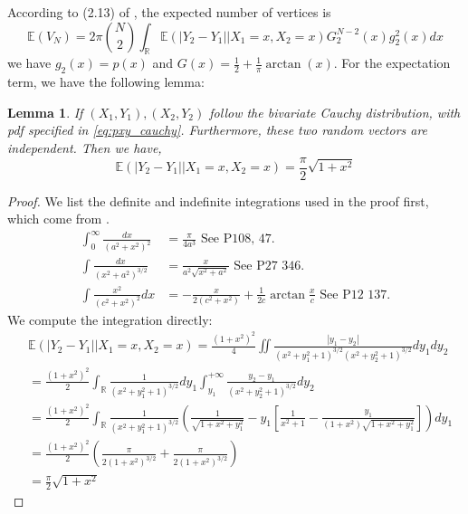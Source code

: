 \documentclass{article}
\newtheorem{lemma}{Lemma}
\def\E{\mathbb{E}}
\def\R{\mathbb{R}}
\begin{document}
According to (2.13) of \cite{efron1965convex},
the expected number of vertices is
\begin{equation}\label{eq:general_2d}
    \E(V_N) = 2\pi \binom{N}{2}
    \int_{\R}\E(|Y_2-Y_1| \Big\vert X_1= x, X_2=x)
    G^{N-2}_2(x) g^2_2(x)dx
\end{equation}
we have $g_2(x) = p(x)$ and $G(x)=\frac{1}{2}+ \frac{1}{\pi}\arctan(x)$.
For the expectation term, we have the following lemma:
\begin{lemma}
    If $(X_1, Y_1), (X_2, Y_2)$ follow the bivariate Cauchy
    distribution, with pdf specified in \eqref{eq:pxy_cauchy}.
    Furthermore, these two random vectors are independent.
    Then we have,
    \begin{equation}\label{eq:cauchy_conditional_expectation}
        \E(|Y_2-Y_1| \Big\vert X_1= x, X_2=x)
        = \frac{\pi}{2}\sqrt{1+x^2}
    \end{equation}
\end{lemma}
\begin{proof}
We list the definite and indefinite integrations
used in the proof first, which come from \cite{integration}.
\begin{align}
    \int_0^{\infty} \frac{dx}{(a^2+x^2)^2}
    & = \frac{\pi}{4a^3} \textrm{ See P108, 47. } \\
    \int \frac{dx}{(x^2+a^2)^{3/2}}
    & = \frac{x}{a^2\sqrt{x^2+a^2}}
    \textrm{ See P27 346.}
    \label{eq:indefinite_inverse_32}\\
    \int \frac{x^2}{(c^2+x^2)^2}dx
    &=-\frac{x}{2(c^2+x^2)}
    +\frac{1}{2c}\arctan\frac{x}{c}
    \textrm{ See P12 137.}
\end{align}
We compute the integration directly:
\begin{align*}
    &\E\left(|Y_2-Y_1| \Big\vert X_1= x, X_2=x\right)
        =\frac{(1+x^2)^2}{4}\iint \frac{|y_1-y_2|}
        {(x^2+y_1^2+1)^{3/2}(x^2+y_2^2+1)^{3/2}}dy_1dy_2\\
        &=\frac{(1+x^2)^2}{2}\int_{\R}\frac{1}{(x^2+y_1^2+1)^{3/2}}
        dy_1\int_{y_1}^{+\infty}\frac{y_2-y_1}
        {(x^2+y_2^2+1)^{3/2}}dy_2 \\
        &=\frac{(1+x^2)^2}{2}\int_{\R}\frac{1}{(x^2+y_1^2+1)^{3/2}}
        \left(\frac{1}{\sqrt{1+x^2+y_1^2}}-y_1\left[\frac{1}{x^2+1}
        -\frac{y_1}{(1+x^2)\sqrt{1+x^2+y_1^2}}\right]\right)dy_1\\
        &=\frac{(1+x^2)^2}{2} \left(\frac{\pi}{2(1+x^2)^{3/2}}
        +\frac{\pi}{2(1+x^2)^{3/2}}\right)\\
        &=\frac{\pi}{2}\sqrt{1+x^2}
\end{align*}
\end{proof}
\end{document}
